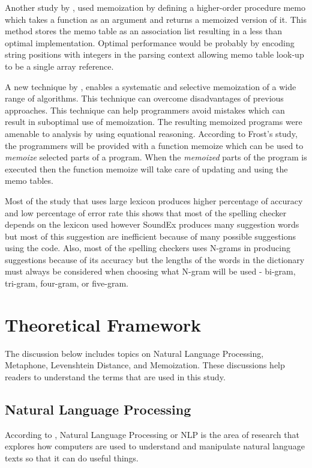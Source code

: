 \documentclass[12pt]{book}
\begin{document}
Another study by \cite{johnson1995memoizationj}, used memoization by defining a higher-order procedure memo which takes a function as an argument and returns a memoized version of it. This method stores the memo table as an association list resulting in a less than optimal implementation. Optimal performance would be probably by encoding string positions with integers in the parsing context allowing memo table look-up to be a single array reference.

A new technique by \cite{frost2003monadic}, enables a systematic and selective memoization of a wide range of algorithms. This technique can overcome disadvantages of previous approaches. This technique can help programmers avoid mistakes which can result in suboptimal use of memoization. The resulting memoized programs were amenable to analysis by using equational reasoning. According to Frost’s study, the programmers will be provided with a function memoize which can be used to \textit{memoize} selected parts of  a program. When the \textit{memoized} parts of the program is executed then the function memoize will take care of updating and using the memo tables.


Most of the study that uses large lexicon produces higher percentage of accuracy and low percentage of error rate this shows that most of the spelling checker depends on the lexicon used however 
SoundEx produces many suggestion words but most of this suggestion are inefficient because of many possible suggestions using the code.
 Also, most of the spelling checkers uses N-grams in producing suggestions because of its accuracy but the lengths of the words in the dictionary must always be considered when choosing what N-gram will be used - bi-gram, tri-gram, four-gram, or five-gram.


\let\cleardoublepage\clearpage
\chapter{Theoretical Framework}
The discussion below includes topics on Natural Language Processing, Metaphone, Levenshtein Distance, and Memoization. These discussions help readers to understand the terms that are used in this study.

\section{Natural Language Processing}

According to \cite{chowdhury2003natural}, Natural Language Processing or NLP is the area of research that explores how computers are used to understand and manipulate natural language texts so that it can do useful things. 
\end{document}
